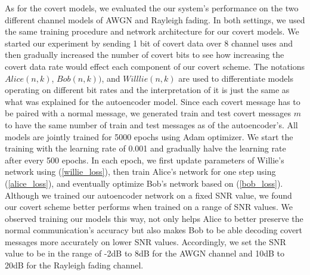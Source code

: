 As for the covert models, we evaluated the our system's performance on the two different channel models of AWGN and Rayleigh fading. In both settings, we used the same training procedure and network architecture for our covert models. We started our experiment by sending 1 bit of covert data over 8 channel uses and then gradually increased the number of covert bits to see how increasing the covert data rate would effect each component of our covert scheme. The notations \(Alice (n,k)\), \(Bob (n,k))\), and \(Willlie (n,k)\) are used to differentiate models operating on different bit rates and the interpretation of it is just the same as what was explained for the autoencoder model. Since each covert message has to be paired with a normal message, we generated train and test covert messages \(m\) to have the same number of train and test messages as of the autoencoder's. All models are jointly trained for 5000 epochs using Adam optimizer. We start the training with the learning rate of 0.001 and gradually halve the learning rate after every 500 epochs. In each epoch, we first update parameters of Willie's network using (\ref{willie_loss}), then train Alice's network for one step using (\ref{alice_loss}), and eventually optimize Bob's network based on (\ref{bob_loss}). Although we trained our autoencoder network on a fixed SNR value, we found our covert scheme better performs when trained on a range of SNR values. We observed training our models this way, not only helps Alice to better preserve the normal communication's accuracy but also makes Bob to be able decoding covert messages more accurately on lower SNR values. Accordingly, we set the SNR value to be in the range of -2dB to 8dB for the AWGN channel and 10dB to 20dB for the Rayleigh fading channel.
